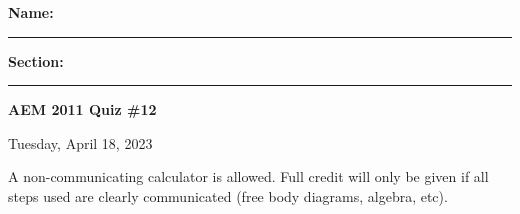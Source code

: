 \documentclass{article}
\begin{document}

\vspace{.5cm}
\noindent
\textbf{Name: }\rule{5cm}{0.4pt}\hspace{.5cm}
\textbf{Section: }\rule{1cm}{0.4pt}
\hfill\textbf{AEM 2011 Quiz \#12}

\noindent
\hfill Tuesday, April 18, 2023
\vspace{1cm}
\noindent

\vspace{.3cm}

\noindent A non-communicating calculator is allowed.  Full credit will only be given if all steps used are clearly communicated (free body diagrams, algebra, etc).

\vspace{0.5cm}












\end{document}
